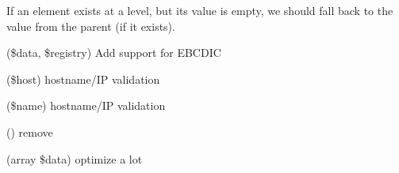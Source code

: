 \begin{DoxyRefList}
If an element exists at a level, but its value is empty, we should fall back to the value from the parent (if it exists).  
\item[\doxylink{report_8contract_8php_a77b973d137fb33212e018b042df6e3e7}{Global(e)} \doxylink{class_simple_pie___misc_a14de4b6f7d8ad707c5845c83221046f9}{Simple\+Pie\+\_\+\+Misc\+::xml\+\_\+encoding} (\$data, \$registry)]\label{todo__todo000043}%
%
Add support for EBCDIC  
\item[\doxylink{report_8contract_8php_a77b973d137fb33212e018b042df6e3e7}{Global(e)} \doxylink{class_laminas_1_1_mail_1_1_transport_1_1_smtp_options_a3796cc8d08abefbb14f15fde02b883a9}{Smtp\+Options\+::set\+Host} (\$host)]\label{todo__todo000022}%
%
hostname/\+IP validation  
\item[\doxylink{report_8contract_8php_a77b973d137fb33212e018b042df6e3e7}{Global(e)} \doxylink{class_laminas_1_1_mail_1_1_transport_1_1_smtp_options_a2fe666694997d047711d7653eca2f132}{Smtp\+Options\+::set\+Name} (\$name)]\label{todo__todo000021}%
%
hostname/\+IP validation  
\item[\doxylink{report_8contract_8php_a77b973d137fb33212e018b042df6e3e7}{Global(e)} \doxylink{namespace_swaggest_1_1_json_schema_1_1_structure_ae7b41b276f968ee07589de4e47702d2b}{Swaggest\+::Json\+Schema\+::Structure\+::get\+From\+Ref} ()]\label{todo__todo000049}%
%
remove  
\item[\doxylink{report_8contract_8php_a77b973d137fb33212e018b042df6e3e7}{Global(e)} \doxylink{class_swaggest_1_1_json_schema_1_1_constraint_1_1_unique_items_aaddbe165d117a288595f25e14149c651}{Unique\+Items\+::is\+Valid} (array \$data)]\label{todo__todo000045}%
%
optimize a lot 
\end{DoxyRefList}